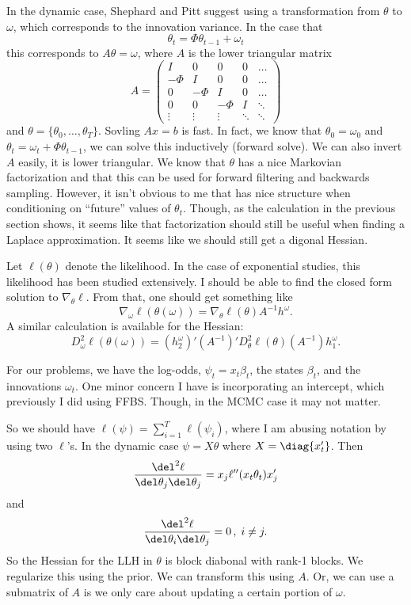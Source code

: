 \documentclass{article}
\begin{document}
In the dynamic case, Shephard and Pitt suggest using a transformation from
$\theta$ to $\omega$, which corresponds to the innovation variance.  In the case
that
\[
\theta_t = \Phi \theta_{t-1} + \omega_t
\]
this corresponds to $A \theta = \omega$, where $A$ is the lower triangular
matrix
\[
A =
\begin{pmatrix}
I & 0 & 0 & 0 & \ldots \\
-\Phi & I & 0 & 0 & \ldots \\
0 & -\Phi & I & 0 & \ldots \\
0 & 0 & -\Phi & I & \ddots \\
\vdots & \vdots & \vdots & \ddots & \ddots
\end{pmatrix}
\]
and $\theta = \{\theta_0, \ldots, \theta_T\}$.  Sovling $Ax = b$ is fast.  In
fact, we know that $\theta_0 = \omega_0$ and $\theta_t = \omega_t + \Phi
\theta_{t-1}$, we can solve this inductively (forward solve).  We can also
invert $A$ easily, it is lower triangular.  We know that $\theta$ has a nice
Markovian factorization and that this can be used for forward filtering and
backwards sampling.  However, it isn't obvious to me that has nice structure
when conditioning on ``future'' values of $\theta_t$.  Though, as the
calculation in the previous section shows, it seems like that factorization
should still be useful when finding a Laplace approximation.  It seems like we
should still get a digonal Hessian.

Let $\ell(\theta)$ denote the likelihood.  In the case of exponential studies,
this likelihood has been studied extensively.  I should be able to find the
closed form solution to $\nabla_\theta \ell$.  From that, one should get
something like
\[
\nabla_\omega \ell (\theta(\omega)) = \nabla_\theta \ell(\theta) A^{-1} h^{\omega}.
\]
A similar calculation is available for the Hessian:
\[
D^2_\omega \ell (\theta(\omega)) = (h_2^{\omega})' (A^{-1})' D^2_\theta \ell(\theta)
(A^{-1}) h_1^{\omega}.
\]

For our problems, we have the log-odds, $\psi_t = x_t \beta_t$, the states
$\beta_t$, and the innovations $\omega_t$.  One minor concern I have is
incorporating an intercept, which previously I did using FFBS.  Though, in the
MCMC case it may not matter.

So we should have $\ell(\psi) = \sum_{i=1}^T \ell(\psi_i)$, where I am abusing
notation by using two $\ell$'s.  In the dynamic case $\psi = X \theta$ where $X
= \diag\{x_t'\}$.  Then
\[
\frac{\del^2 \ell}{\del \theta_j \del \theta_j} = x_j \ell''(x_t \theta_t) x_j'
\]
and
\[
\frac{\del^2 \ell}{\del \theta_i \del \theta_j} = 0 \, , \; i \neq j. 
\]
So the Hessian for the LLH in $\theta$ is block diabonal with rank-1 blocks.  We
regularize this using the prior.  We can transform this using $A$.  Or, we can
use a submatrix of $A$ is we only care about updating a certain portion of
$\omega$.
\end{document}
